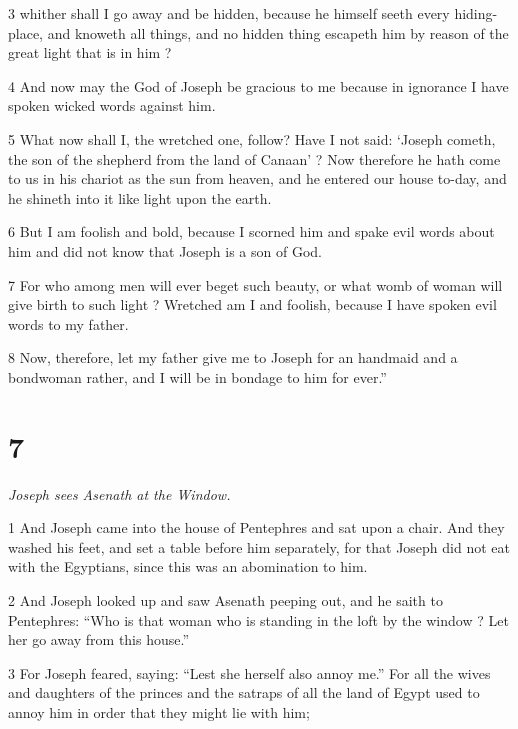 \par 3 whither shall I go away and be hidden, because he himself seeth every hiding-place, and knoweth all things, and no hidden thing escapeth him by reason of the great light that is in him ? 

\par 4 And now may the God of Joseph be gracious to me because in ignorance I have spoken wicked words against him. 

\par 5 What now shall I, the wretched one, follow? Have I not said: ‘Joseph cometh, the son of the shepherd from the land of Canaan’ ? Now therefore he hath come to us in his chariot as the sun from heaven, and he entered our house to-day, and he shineth into it like light upon the earth. 

\par 6 But I am foolish and bold, because I scorned him and spake evil words about him and did not know that Joseph is a son of God. 

\par 7 For who among men will ever beget such beauty, or what womb of woman will give birth to such light ? Wretched am I and foolish, because I have spoken evil words to my father. 

\par 8 Now, therefore, let my father give me to Joseph for an handmaid and a bondwoman rather, and I will be in bondage to him for ever.”

\chapter{7}

\par \textit{Joseph sees Asenath at the Window.}

\par 1 And Joseph came into the house of Pentephres and sat upon a chair. And they washed his feet, and set a table before him separately, for that Joseph did not eat with the Egyptians, since this was an abomination to him. 

\par 2 And Joseph looked up and saw Asenath peeping out, and he saith to Pentephres: “Who is that woman who is standing in the loft by the window ? Let her go away from this house.” 

\par 3 For Joseph feared, saying: “Lest she herself also annoy me.” For all the wives and daughters of the princes and the satraps of all the land of Egypt used to annoy him in order that they might lie with him; 

